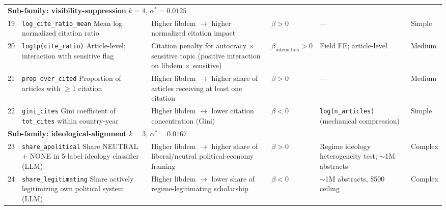 \documentclass[12pt,a4paper]{article}
\begin{document}
\begin{landscape}
\begin{longtable}{
  @{}
  p{0.6cm}   %
  p{3.6cm}   %
  p{6.0cm}   %
  p{1.4cm}   %
  p{4.0cm}   %
  p{1.2cm}   %
  @{}
}
\multicolumn{6}{l}{\textbf{Sub-family: visibility-suppression} \quad $k=4$, $\alpha^* = 0.0125$} \\[2pt]

19 & \texttt{log\_cite\_ratio\_mean} \newline \footnotesize{Mean log normalized citation ratio}
   & Higher libdem $\to$ higher normalized citation impact
   & $\beta > 0$ & --- & Simple \\[4pt]

20 & \texttt{log1p(cite\_ratio)} \newline \footnotesize{Article-level; interaction with sensitive flag}
   & Citation penalty for autocracy $\times$ sensitive topic (positive interaction on libdem $\times$ sensitive)
   & $\beta_{\text{interaction}} > 0$ & Field FE; article-level & Medium \\[4pt]

21 & \texttt{prop\_ever\_cited} \newline \footnotesize{Proportion of articles with $\geq 1$ citation}
   & Higher libdem $\to$ higher share of articles receiving at least one citation
   & $\beta > 0$ & --- & Medium \\[4pt]

22 & \texttt{gini\_cites} \newline \footnotesize{Gini coefficient of \texttt{tot\_cites} within country-year}
   & Higher libdem $\to$ lower citation concentration (Gini)
   & $\beta < 0$ & \texttt{log(n\_articles)} (mechanical compression) & Simple \\[10pt]

\multicolumn{6}{l}{\textbf{Sub-family: ideological-alignment} \quad $k=3$, $\alpha^* = 0.0167$} \\[2pt]

23 & \texttt{share\_apolitical} \newline \footnotesize{Share NEUTRAL + NONE in 5-label ideology classifier (LLM)}
   & Higher libdem $\to$ higher share of liberal/neutral political-economy framing
   & $\beta > 0$ & Regime ideology heterogeneity test; ${\sim}$1M abstracts & Complex \\[4pt]

24 & \texttt{share\_legitimating} \newline \footnotesize{Share actively legitimizing own political system (LLM)}
   & Higher libdem $\to$ lower share of regime-legitimating scholarship
   & $\beta < 0$ & ${\sim}$1M abstracts, \$500 ceiling & Complex \\[4pt]


\end{longtable}
\end{landscape}
\end{document}
